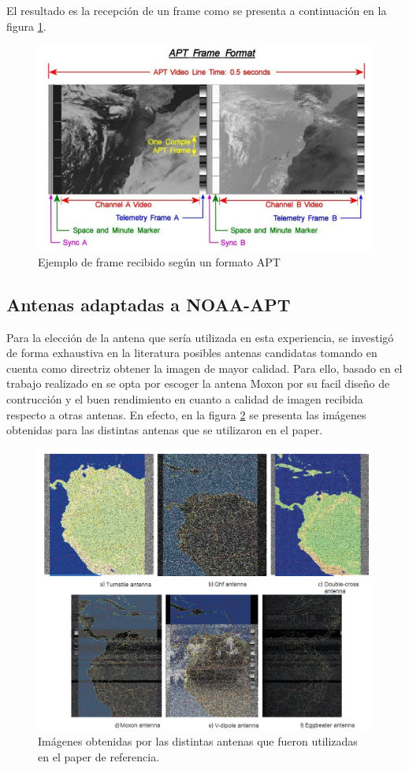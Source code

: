 El resultado es la recepción de un frame como se presenta a continuación en la figura \ref{fig:imagen_frame}.

\begin{figure}[h!]
    \centering
    \includegraphics[width=0.7\linewidth]{img/result.png}
    \caption{Ejemplo de frame recibido según un formato APT}
    \label{fig:imagen_frame}
\end{figure}

\subsection{Antenas adaptadas a NOAA-APT}
Para la elección de la antena que sería utilizada en esta experiencia, se investigó de forma exhaustiva en la literatura posibles antenas candidatas tomando en cuenta como directriz obtener la imagen de mayor calidad. Para ello, basado en el trabajo realizado en \cite{PazPenagos2024} se opta por escoger la antena Moxon por su facil diseño de contrucción y el buen rendimiento en cuanto a calidad de imagen recibida respecto a otras antenas. En efecto, en la figura \ref{fig:antenas_paper} se presenta las imágenes obtenidas para las distintas antenas que se utilizaron en el paper.

\begin{figure}[h!]
    \centering
    \includegraphics[width=0.7\linewidth]{img/antenas.png}
    \caption{Imágenes obtenidas por las distintas antenas que fueron utilizadas en el paper de referencia.}
    \label{fig:antenas_paper}
\end{figure}


